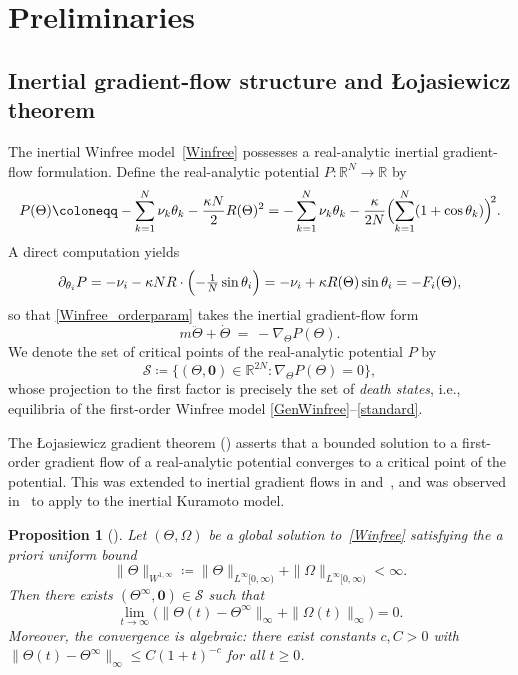 \documentclass[11pt,reqno]{amsart}
\newcommand{\R}{\mathbb{R}}
\newtheorem{proposition}[lemma]{Proposition}
\theoremstyle{definition}
\theoremstyle{remark}
\begin{document}
\section{Preliminaries}\label{sec:prelim}

\subsection{Inertial gradient-flow structure and \L ojasiewicz theorem}

The inertial Winfree model~\eqref{Winfree} possesses a real-analytic
inertial gradient-flow formulation. Define the real-analytic potential
$P\colon\R^N\to\R$ by
\begin{equation}\label{def:P}
P(\Theta)\coloneqq-\sum_{k=1}^N\nu_k\theta_k-\frac{\kappa N}{2}R(\Theta)^2
=-\sum_{k=1}^N\nu_k\theta_k-\frac{\kappa}{2N}\Bigl(\sum_{k=1}^N(1+\cos\theta_k)\Bigr)^{\!2}.
\end{equation}
A direct computation yields
\[
\partial_{\theta_i}P
=-\nu_i-\kappa N R\cdot\Bigl(-\tfrac{1}{N}\sin\theta_i\Bigr)
=-\nu_i+\kappa R(\Theta)\sin\theta_i
=-F_i(\Theta),
\]
so that \eqref{Winfree_orderparam} takes the inertial gradient-flow form
\begin{equation}\label{eq:gradflow}
m\ddot\Theta+\dot\Theta\ =\ -\nabla_\Theta P(\Theta).
\end{equation}
We denote the set of critical
points of the real-analytic potential $P$ by
\[
\mathcal S\coloneqq\{(\Theta,{\mathbf 0})\in\R^{2N}\colon \nabla_\Theta P(\Theta)=0\},
\]
whose projection to the first factor is precisely the set of
\emph{death states}, i.e., equilibria of the first-order Winfree model
\eqref{GenWinfree}--\eqref{standard}.

The \L ojasiewicz gradient theorem (\cite{lojasiewicz1963propriete,
lojasiewicz1982trajectoires}) asserts that a bounded solution to a
first-order gradient flow of a real-analytic potential converges to a
critical point of the potential. This was extended to inertial
gradient flows in \cite[Theorem~1.1]{haraux1998convergence}
and~\cite[Corollary~5.1]{begout2015damped}, and was observed
in~\cite[Proposition~2.1]{choi2014complete} to apply to the inertial
Kuramoto model.

\begin{proposition}[\cite{haraux1998convergence,begout2015damped}]\label{prop:lojasiewicz}
Let $(\Theta,\Omega)$ be a global solution to~\eqref{Winfree} satisfying
the a priori uniform bound
\[
\|\Theta\|_{W^{1,\infty}}\coloneqq\|\Theta\|_{L^\infty[0,\infty)}+\|\Omega\|_{L^\infty[0,\infty)}<\infty.
\]
Then there exists $(\Theta^\infty,{\mathbf 0})\in\mathcal S$ such that
\[
\lim_{t\to\infty}\bigl(\|\Theta(t)-\Theta^\infty\|_\infty+\|\Omega(t)\|_\infty\bigr)=0.
\]
Moreover, the convergence is algebraic: there exist constants $c,C>0$ with
$\|\Theta(t)-\Theta^\infty\|_\infty\le C(1+t)^{-c}$ for all $t\ge 0$.
\end{proposition}
\end{document}
